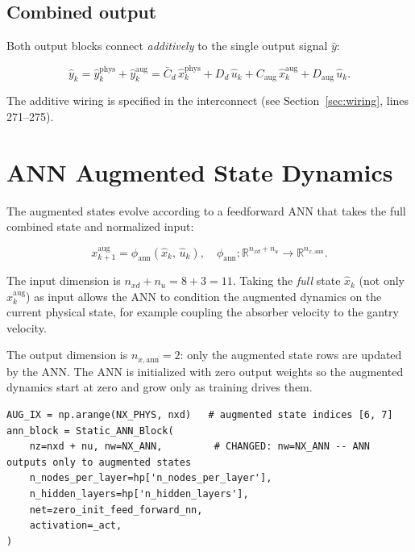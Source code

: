 \documentclass[11pt,a4paper]{article}
\newcommand{\codetitle}[2]{\small\texttt{#1}\quad lines #2}
\begin{document}
\subsection{Combined output}

Both output blocks connect \emph{additively} to the single output signal $\hat{y}$:

\begin{equation}
  \hat{y}_k = \hat{y}_k^{\mathrm{phys}} + \hat{y}_k^{\mathrm{aug}}
            = \bar{C}_d\, \hat{x}_k^{\mathrm{phys}}
            + D_d\, \hat{u}_k
            + C_{\mathrm{aug}}\, \hat{x}_k^{\mathrm{aug}}
            + D_{\mathrm{aug}}\, \hat{u}_k.
  \label{eq:y_combined}
\end{equation}

The additive wiring is specified in the interconnect (see
Section~\ref{sec:wiring}, lines 271--275).

\section{ANN Augmented State Dynamics}
\label{sec:ann}

The augmented states evolve according to a feedforward ANN
that takes the full combined state and normalized input:

\begin{equation}
  x_{k+1}^{\mathrm{aug}} = \phi_{\mathrm{ann}}\!\left(\hat{x}_k,\, \hat{u}_k\right),
  \quad \phi_{\mathrm{ann}} : \mathbb{R}^{n_{xd}+n_u} \to \mathbb{R}^{n_{x,\mathrm{ann}}}.
  \label{eq:ann_dyn}
\end{equation}

The input dimension is $n_{xd} + n_u = 8 + 3 = 11$.
Taking the \emph{full} state $\hat{x}_k$ (not only $x_k^{\mathrm{aug}}$)
as input allows the ANN to condition the augmented dynamics on the
current physical state, for example coupling the absorber velocity
to the gantry velocity.

The output dimension is $n_{x,\mathrm{ann}} = 2$: only the augmented
state rows are updated by the ANN.
The ANN is initialized with zero output weights so the augmented
dynamics start at zero and grow only as training drives them.

\begin{lstlisting}[style=py,
  title={\codetitle{gantry\_interconnect\_dynamic.py}{251--258}},
  firstnumber=251]
AUG_IX = np.arange(NX_PHYS, nxd)   # augmented state indices [6, 7]
ann_block = Static_ANN_Block(
    nz=nxd + nu, nw=NX_ANN,         # CHANGED: nw=NX_ANN -- ANN outputs only to augmented states
    n_nodes_per_layer=hp['n_nodes_per_layer'],
    n_hidden_layers=hp['n_hidden_layers'],
    net=zero_init_feed_forward_nn,
    activation=_act,
)
\end{lstlisting}
\end{document}

